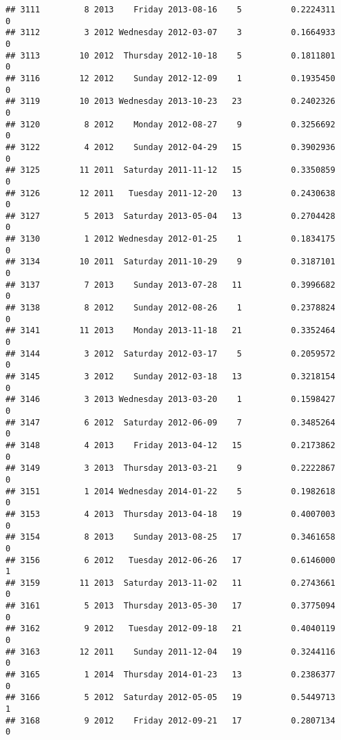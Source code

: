 \documentclass[
]{article}
\begin{document}
\begin{verbatim}
## 3111         8 2013    Friday 2013-08-16    5          0.2224311             0
## 3112         3 2012 Wednesday 2012-03-07    3          0.1664933             0
## 3113        10 2012  Thursday 2012-10-18    5          0.1811801             0
## 3116        12 2012    Sunday 2012-12-09    1          0.1935450             0
## 3119        10 2013 Wednesday 2013-10-23   23          0.2402326             0
## 3120         8 2012    Monday 2012-08-27    9          0.3256692             0
## 3122         4 2012    Sunday 2012-04-29   15          0.3902936             0
## 3125        11 2011  Saturday 2011-11-12   15          0.3350859             0
## 3126        12 2011   Tuesday 2011-12-20   13          0.2430638             0
## 3127         5 2013  Saturday 2013-05-04   13          0.2704428             0
## 3130         1 2012 Wednesday 2012-01-25    1          0.1834175             0
## 3134        10 2011  Saturday 2011-10-29    9          0.3187101             0
## 3137         7 2013    Sunday 2013-07-28   11          0.3996682             0
## 3138         8 2012    Sunday 2012-08-26    1          0.2378824             0
## 3141        11 2013    Monday 2013-11-18   21          0.3352464             0
## 3144         3 2012  Saturday 2012-03-17    5          0.2059572             0
## 3145         3 2012    Sunday 2012-03-18   13          0.3218154             0
## 3146         3 2013 Wednesday 2013-03-20    1          0.1598427             0
## 3147         6 2012  Saturday 2012-06-09    7          0.3485264             0
## 3148         4 2013    Friday 2013-04-12   15          0.2173862             0
## 3149         3 2013  Thursday 2013-03-21    9          0.2222867             0
## 3151         1 2014 Wednesday 2014-01-22    5          0.1982618             0
## 3153         4 2013  Thursday 2013-04-18   19          0.4007003             0
## 3154         8 2013    Sunday 2013-08-25   17          0.3461658             0
## 3156         6 2012   Tuesday 2012-06-26   17          0.6146000             1
## 3159        11 2013  Saturday 2013-11-02   11          0.2743661             0
## 3161         5 2013  Thursday 2013-05-30   17          0.3775094             0
## 3162         9 2012   Tuesday 2012-09-18   21          0.4040119             0
## 3163        12 2011    Sunday 2011-12-04   19          0.3244116             0
## 3165         1 2014  Thursday 2014-01-23   13          0.2386377             0
## 3166         5 2012  Saturday 2012-05-05   19          0.5449713             1
## 3168         9 2012    Friday 2012-09-21   17          0.2807134             0

\end{verbatim}
\end{document}
